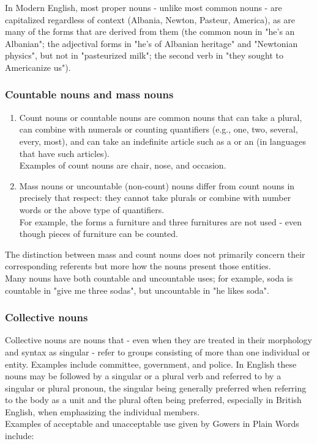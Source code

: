 In Modern English, most proper nouns - unlike most common nouns - are capitalized regardless of context (Albania, Newton, Pasteur, America), as are many of the forms that are derived from them (the common noun in "he's an Albanian"; the adjectival forms in "he's of Albanian heritage" and "Newtonian physics", but not in "pasteurized milk"; the second verb in "they sought to Americanize us").


\subsubsection{Countable nouns and mass nouns \cite{wiki-noun}}
\begin{enumerate}
    \item Count nouns or countable nouns are common nouns that can take a plural, can combine with numerals or counting quantifiers (e.g., one, two, several, every, most), and can take an indefinite article such as a or an (in languages that have such articles). \\ Examples of count nouns are chair, nose, and occasion.
    \item Mass nouns or uncountable (non-count) nouns differ from count nouns in precisely that respect: they cannot take plurals or combine with number words or the above type of quantifiers. \\
    For example, the forms a furniture and three furnitures are not used - even though pieces of furniture can be counted. 
\end{enumerate}

The distinction between mass and count nouns does not primarily concern their corresponding referents but more how the nouns present those entities.\\
Many nouns have both countable and uncountable uses; for example, soda is countable in "give me three sodas", but uncountable in "he likes soda".


\subsubsection{Collective nouns \cite{wiki-noun}}
Collective nouns are nouns that - even when they are treated in their morphology and syntax as singular - refer to groups consisting of more than one individual or entity. Examples include committee, government, and police. In English these nouns may be followed by a singular or a plural verb and referred to by a singular or plural pronoun, the singular being generally preferred when referring to the body as a unit and the plural often being preferred, especially in British English, when emphasizing the individual members. \\Examples of acceptable and unacceptable use given by Gowers in Plain Words include:

